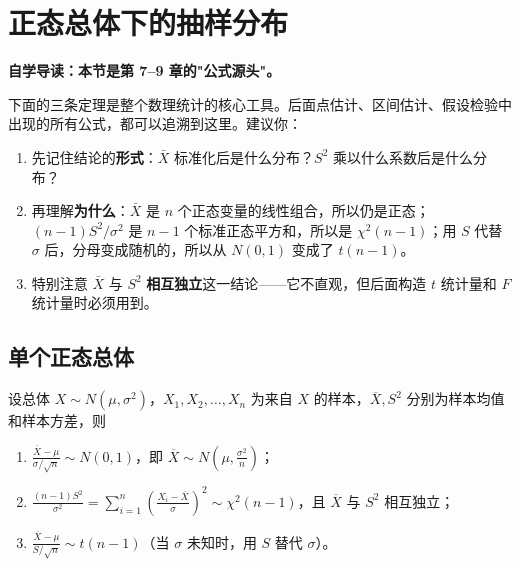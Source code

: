 ﻿\documentclass[lang=cn,11pt]{elegantbook}
\begin{document}
\section{正态总体下的抽样分布}

\begin{note}
\textbf{自学导读：本节是第 7--9 章的"公式源头"。}

下面的三条定理是整个数理统计的核心工具。后面点估计、区间估计、假设检验中出现的所有公式，都可以追溯到这里。建议你：
\begin{enumerate}
    \item 先记住结论的\textbf{形式}：$\bar{X}$ 标准化后是什么分布？$S^2$ 乘以什么系数后是什么分布？
    \item 再理解\textbf{为什么}：$\bar{X}$ 是 $n$ 个正态变量的线性组合，所以仍是正态；$(n-1)S^2/\sigma^2$ 是 $n-1$ 个标准正态平方和，所以是 $\chi^2(n-1)$；用 $S$ 代替 $\sigma$ 后，分母变成随机的，所以从 $N(0,1)$ 变成了 $t(n-1)$。
    \item 特别注意 $\bar{X}$ 与 $S^2$ \textbf{相互独立}这一结论——它不直观，但后面构造 $t$ 统计量和 $F$ 统计量时必须用到。
\end{enumerate}
\end{note}

\subsection{单个正态总体}

\begin{theorem}[单正态总体抽样分布] \label{thm:normal-single}
设总体 \(X \sim N(\mu, \sigma^2)\)，\(X_1, X_2, \dots, X_n\) 为来自 \(X\) 的样本，\(\overline{X}, S^2\) 分别为样本均值和样本方差，则
\begin{enumerate}
    \item \(\displaystyle\frac{\overline{X} - \mu}{\sigma/\sqrt{n}} \sim N(0,1)\)，即 \(\overline{X} \sim N\!\left(\mu, \frac{\sigma^2}{n}\right)\)；
    \item \(\displaystyle\frac{(n-1)S^2}{\sigma^2} = \sum_{i=1}^{n}\!\left(\frac{X_i - \overline{X}}{\sigma}\right)^{\!2} \sim \chi^2(n-1)\)，且 \(\overline{X}\) 与 \(S^2\) 相互独立；
    \item \(\displaystyle\frac{\overline{X} - \mu}{S/\sqrt{n}} \sim t(n-1)\)（当 \(\sigma\) 未知时，用 \(S\) 替代 \(\sigma\)）。
\end{enumerate}
\end{theorem}
\end{document}
